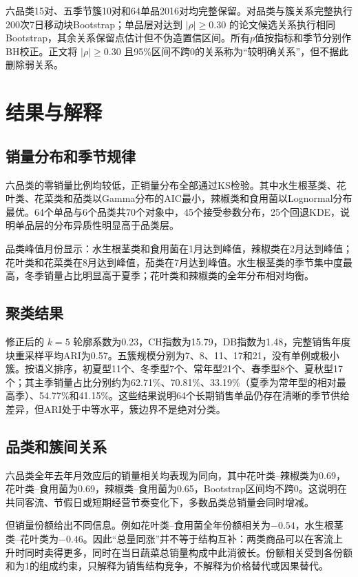 \documentclass[UTF8,12pt]{ctexart}
\begin{document}
六品类15对、五季节簇10对和64单品2016对均完整保留。对品类与簇关系完整执行200次7日移动块Bootstrap；单品层对达到 $|\rho|\ge0.30$ 的论文候选关系执行相同Bootstrap，其余关系保留点估计但不伪造置信区间。所有$p$值按指标和季节分别作BH校正。正文将 $|\rho|\ge0.30$ 且95\%区间不跨0的关系称为“较明确关系”，但不据此删除弱关系。

\section{结果与解释}

\subsection{销量分布和季节规律}

六品类的零销量比例均较低，正销量分布全部通过KS检验。其中水生根茎类、花叶类、花菜类和茄类以Gamma分布的AIC最小，辣椒类和食用菌以Lognormal分布最优。64个单品与6个品类共70个对象中，45个接受参数分布，25个回退KDE，说明单品层的分布异质性明显高于品类层。

品类峰值月份显示：水生根茎类和食用菌在1月达到峰值，辣椒类在2月达到峰值；花叶类和花菜类在8月达到峰值，茄类在7月达到峰值。水生根茎类的季节集中度最高，冬季销量占比明显高于夏季；花叶类和辣椒类的全年分布相对均衡。

\subsection{聚类结果}

修正后的 $k=5$ 轮廓系数为0.23，CH指数为15.79，DB指数为1.48，完整销售年度块重采样平均ARI为0.57。五簇规模分别为7、8、11、17和21，没有单例或极小簇。按语义排序，初夏型11个、冬季型7个、常年型21个、春季型8个、夏秋型17个；其主季销量占比分别约为62.71\%、70.81\%、33.19\%（夏季为常年型的相对最高季）、54.77\%和41.15\%。这些结果说明64个长期销售单品仍存在清晰的季节供给差异，但ARI处于中等水平，簇边界不是绝对分类。

\subsection{品类和簇间关系}

六品类全年去年月效应后的销量相关均表现为同向，其中花叶类--辣椒类为0.69，花叶类--食用菌为0.69，辣椒类--食用菌为0.65，Bootstrap区间均不跨0。这说明在共同客流、节假日或短期经营节奏变化下，多数品类总销量会同时增减。

但销量份额给出不同信息。例如花叶类--食用菌全年份额相关为$-0.54$，水生根茎类--花叶类为$-0.46$。因此“总量同涨”并不等于结构互补：两类商品可以在客流上升时同时卖得更多，同时在当日蔬菜总销量构成中此消彼长。份额相关受到各份额和为1的组成约束，只解释为销售结构竞争，不解释为价格替代或因果替代。
\end{document}
